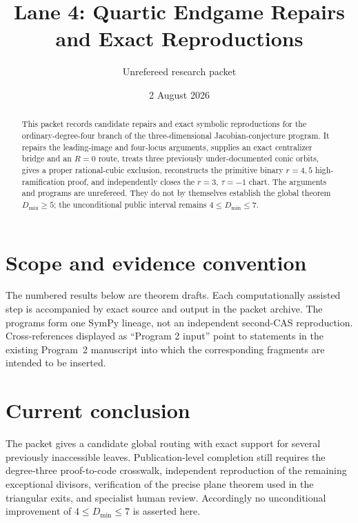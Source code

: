 \documentclass[11pt]{article}
\title{Lane 4: Quartic Endgame Repairs and Exact Reproductions}
\author{Unrefereed research packet}
\date{2 August 2026}
\theoremstyle{remark}
\newcounter{externalinput}
\begin{document}
\maketitle

\begin{abstract}
This packet records candidate repairs and exact symbolic reproductions for the
ordinary-degree-four branch of the three-dimensional Jacobian-conjecture
program.  It repairs the leading-image and four-locus arguments, supplies an
exact centralizer bridge and an $R=0$ route, treats three previously
under-documented conic orbits, gives a proper rational-cubic exclusion,
reconstructs the primitive binary $r=4,5$ high-ramification proof, and
independently closes the $r=3$, $\tau=-1$ chart.  The arguments and programs
are unrefereed.  They do not by themselves establish the global theorem
$D_{\min}\geq5$; the unconditional public interval remains
$4\leq D_{\min}\leq7$.
\end{abstract}

\section*{Scope and evidence convention}
\label{lem:leading-image}
\label{prop:four-loci}
\label{lem:weighted-field}
\label{prop:easy-branches}
\label{lem:quadratic-coordinate}
The numbered results below are theorem drafts.  Each computationally assisted
step is accompanied by exact source and output in the packet archive.  The
programs form one SymPy lineage, not an independent second-CAS reproduction.
Cross-references displayed as ``Program 2 input'' point to statements in the
existing Program~2 manuscript into which the corresponding fragments are
intended to be inserted.








\section*{Current conclusion}
The packet gives a candidate global routing with exact support for several
previously inaccessible leaves.  Publication-level completion still requires
the degree-three proof-to-code crosswalk, independent reproduction of the
remaining exceptional divisors, verification of the precise plane theorem
used in the triangular exits, and specialist human review.  Accordingly no
unconditional improvement of $4\leq D_{\min}\leq7$ is asserted here.
\end{document}
